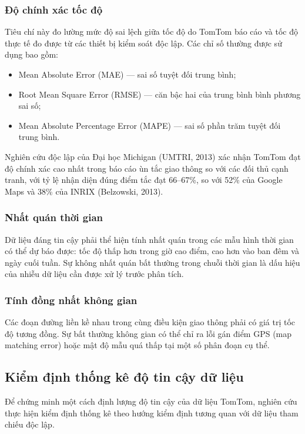 \subsubsection{Độ chính xác tốc độ }
Tiêu chí này đo lường mức độ sai lệch giữa tốc độ do TomTom báo cáo và tốc độ thực tế đo được từ các thiết bị kiểm soát độc lập. Các chỉ số thường được sử dụng bao gồm:
\begin{itemize}
    \item Mean Absolute Error (MAE) --- sai số tuyệt đối trung bình;
    \item Root Mean Square Error (RMSE) --- căn bậc hai của trung bình bình phương sai số;
    \item Mean Absolute Percentage Error (MAPE) --- sai số phần trăm tuyệt đối trung bình.
\end{itemize}

Nghiên cứu độc lập của Đại học Michigan (UMTRI, 2013) xác nhận TomTom đạt độ chính xác cao nhất trong báo cáo ùn tắc giao thông so với các đối thủ cạnh tranh, với tỷ lệ nhận diện đúng điểm tắc đạt 66--67\%, so với 52\% của Google Maps và 38\% của INRIX (Belzowski, 2013).

\subsubsection{Nhất quán thời gian}
Dữ liệu đáng tin cậy phải thể hiện tính nhất quán trong các mẫu hình thời gian có thể dự báo được: tốc độ thấp hơn trong giờ cao điểm, cao hơn vào ban đêm và ngày cuối tuần. Sự không nhất quán bất thường trong chuỗi thời gian là dấu hiệu của nhiễu dữ liệu cần được xử lý trước phân tích.

\subsubsection{Tính đồng nhất không gian}
Các đoạn đường liền kề nhau trong cùng điều kiện giao thông phải có giá trị tốc độ tương đồng. Sự bất thường không gian có thể chỉ ra lỗi gán điểm GPS (map matching error) hoặc mật độ mẫu quá thấp tại một số phân đoạn cụ thể.

\subsection{Kiểm định thống kê độ tin cậy dữ liệu}
Để chứng minh một cách định lượng độ tin cậy của dữ liệu TomTom, nghiên cứu thực hiện kiểm định thống kê theo hướng kiểm định tương quan với dữ liệu tham chiếu độc lập.

